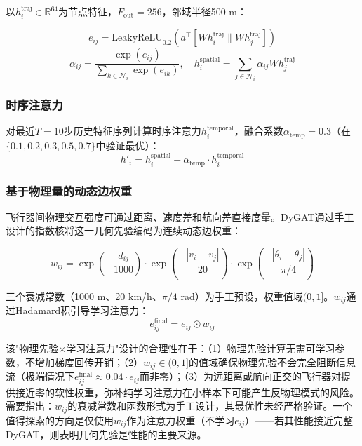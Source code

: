 \documentclass[12pt,a4paper,UTF8]{ctexart}
\begin{document}
以$h_i^{\text{traj}} \in \mathbb{R}^{64}$为节点特征，$F_{\text{out}}=256$，邻域半径500 m：

\begin{equation}
    e_{ij} = \text{LeakyReLU}_{0.2}\!\left(a^{\top}[W h_i^{\text{traj}} \parallel W h_j^{\text{traj}}]\right)
\end{equation}
\begin{equation}
    \alpha_{ij} = \frac{\exp(e_{ij})}{\sum_{k \in \mathcal{N}_i} \exp(e_{ik})},\quad
    h_i^{\text{spatial}} = \sum_{j \in \mathcal{N}_i} \alpha_{ij} W h_j^{\text{traj}}
\end{equation}

\subsubsection{时序注意力}

对最近$T=10$步历史特征序列计算时序注意力$h_i^{\text{temporal}}$，融合系数$\alpha_{\text{temp}} = 0.3$（在$\{0.1,0.2,0.3,0.5,0.7\}$中验证最优）：
\begin{equation}
    h'_i = h_i^{\text{spatial}} + \alpha_{\text{temp}} \cdot h_i^{\text{temporal}}
\end{equation}

\subsubsection{基于物理量的动态边权重}

飞行器间物理交互强度可通过距离、速度差和航向差直接度量。DyGAT通过手工设计的指数核将这一几何先验编码为连续动态边权重：

\begin{equation}
    w_{ij} = \exp\!\left(-\frac{d_{ij}}{1000}\right) \cdot \exp\!\left(-\frac{|v_i - v_j|}{20}\right) \cdot \exp\!\left(-\frac{|\theta_i - \theta_j|}{\pi/4}\right)
\end{equation}

三个衰减常数（1000 m、20 km/h、$\pi/4$ rad）为手工预设，权重值域$(0, 1]$。$w_{ij}$通过Hadamard积引导学习注意力：
\begin{equation}
    e_{ij}^{\text{final}} = e_{ij} \odot w_{ij}
\end{equation}

该"物理先验$\times$学习注意力"设计的合理性在于：（1）物理先验计算无需可学习参数，不增加梯度回传开销；（2）$w_{ij} \in (0, 1]$的值域确保物理先验不会完全阻断信息流（极端情况下$e_{ij}^{\text{final}} \approx 0.04 \cdot e_{ij}$而非零）；（3）为远距离或航向正交的飞行器对提供接近零的软性权重，弥补纯学习注意力在小样本下可能产生反物理模式的风险。需要指出：$w_{ij}$的衰减常数和函数形式为手工设计，其最优性未经严格验证。一个值得探索的方向是仅使用$w_{ij}$作为注意力权重（不学习$e_{ij}$）——若其性能接近完整DyGAT，则表明几何先验是性能的主要来源。
\end{document}
